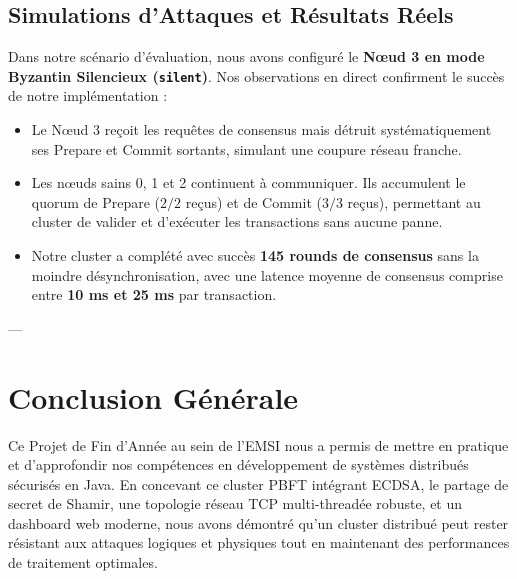 \documentclass[11pt,a4paper]{article}
\begin{document}
\subsection{Simulations d'Attaques et Résultats Réels}
Dans notre scénario d'évaluation, nous avons configuré le \textbf{Nœud 3 en mode Byzantin Silencieux (\texttt{silent})}. 
Nos observations en direct confirment le succès de notre implémentation :
\begin{itemize}
    \item Le Nœud 3 reçoit les requêtes de consensus mais détruit systématiquement ses Prepare et Commit sortants, simulant une coupure réseau franche.
    \item Les nœuds sains 0, 1 et 2 continuent à communiquer. Ils accumulent le quorum de Prepare ($2/2$ reçus) et de Commit ($3/3$ reçus), permettant au cluster de valider et d'exécuter les transactions sans aucune panne.
    \item Notre cluster a complété avec succès \textbf{145 rounds de consensus} sans la moindre désynchronisation, avec une latence moyenne de consensus comprise entre \textbf{10 ms et 25 ms} par transaction.
\end{itemize}

---

\section*{Conclusion Générale}
Ce Projet de Fin d'Année au sein de l'EMSI nous a permis de mettre en pratique et d'approfondir nos compétences en développement de systèmes distribués sécurisés en Java. En concevant ce cluster PBFT intégrant ECDSA, le partage de secret de Shamir, une topologie réseau TCP multi-threadée robuste, et un dashboard web moderne, nous avons démontré qu'un cluster distribué peut rester résistant aux attaques logiques et physiques tout en maintenant des performances de traitement optimales.
\end{document}
